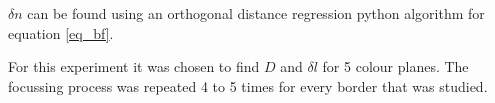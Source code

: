 $\delta n$ can be found using an orthogonal distance regression python algorithm for equation \ref{eq_bf}.

For this experiment it was chosen to find $D$ and $\delta l$ for 5 colour planes. The focussing process was repeated 4 to 5 times for every border that was studied.




\begin{comment}
The Experimentele opstelling or Experimentele  methode (Experimental  set  up  or  Experimental method) chapter describes the experimental setup and the experimental methods used in sufficient detail such that a reader can judge the soundness and, in principle, may verify the conclusions of your research. Also,  this  chapter  should  be  informative  for  a  reader  who  wants  to  perform  similar  research.  Preferably  use clear sketches of the setup, rather than photographs. In this chapter you also describe the accuracywith which direct observables have been measured, and the accuracy of the important deduced quantities. Detailed accuracy calculations should be put in an Appendix
\end{comment}
